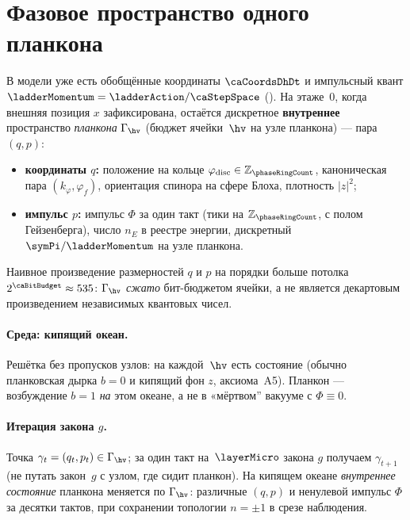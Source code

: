 \section{Фазовое пространство одного планкона}
\label{sec:floor0-phase-space}

В модели уже есть обобщённые координаты $\caCoordsDhDt$ и импульсный квант $\ladderMomentum=\ladderAction/\caStepSpace$
().
На этаже~0, когда внешняя позиция $x$ зафиксирована, остаётся дискретное
\textbf{внутреннее} пространство \emph{планкона} $\Gamma_{\hv}$ (бюджет ячейки~$\hv$ на узле планкона) --- пара $(q,p)$:

\begin{itemize}[noitemsep]
\item \textbf{координаты $q$:} положение на кольце $\varphi_{\mathrm{disc}}\in\mathbb{Z}_{\phaseRingCount}$,
  каноническая пара $(k_\varphi,\varphi_f)$, ориентация спинора на сфере Блоха, плотность $|z|^2$;
\item \textbf{импульс $p$:} импульс $\Phi$ за один такт (тики на $\mathbb{Z}_{\phaseRingCount}$, с полом Гейзенберга),
  число $n_E$ в реестре энергии, дискретный $\symPi/\ladderMomentum$ на узле планкона.
\end{itemize}

Наивное произведение размерностей $q$ и $p$ на порядки больше потолка
$2^{\caBitBudget}\approx 535$: $\Gamma_{\hv}$ \emph{сжато} бит-бюджетом ячейки,
а не является декартовым произведением независимых квантовых чисел.

\paragraph{Среда: кипящий океан.}
Решётка без пропусков узлов: на каждой~$\hv$ есть состояние (обычно планковская дырка $b=0$
и кипящий фон $z$, аксиома~A5).
Планкон --- возбуждение $b=1$ \emph{на} этом океане, а не в «мёртвом'' вакууме
с $\Phi\equiv 0$.

\paragraph{Итерация закона $g$.}
Точка $\gamma_t=(q_t,p_t)\in\Gamma_{\hv}$; за один такт на~$\layerMicro$ закона $g$ получаем $\gamma_{t+1}$
(не путать закон~$g$ с узлом, где сидит планкон).
На кипящем океане \emph{внутреннее состояние} планкона меняется по $\Gamma_{\hv}$: различные $(q,p)$
и ненулевой импульс $\Phi$ за десятки тактов, при сохранении топологии $n=\pm1$ в срезе наблюдения.

